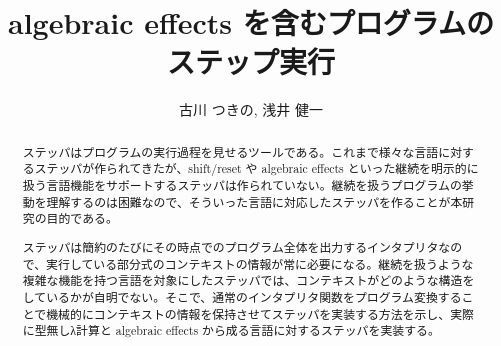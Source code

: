 \documentclass[japanese,draft]{jssst_ppl} %
\title{algebraic effects を含むプログラムのステップ実行}
\author{古川 つきの, 浅井 健一}
\begin{document}
\maketitle
\begin{abstract}
  ステッパはプログラムの実行過程を見せるツールである。これまで様々な言語に対するステッパが作られてきたが、shift/reset や algebraic effects といった継続を明示的に扱う言語機能をサポートするステッパは作られていない。継続を扱うプログラムの挙動を理解するのは困難なので、そういった言語に対応したステッパを作ることが本研究の目的である。
  
  ステッパは簡約のたびにその時点でのプログラム全体を出力するインタプリタなので、実行している部分式のコンテキストの情報が常に必要になる。継続を扱うような複雑な機能を持つ言語を対象にしたステッパでは、コンテキストがどのような構造をしているかが自明でない。そこで、通常のインタプリタ関数をプログラム変換することで機械的にコンテキストの情報を保持させてステッパを実装する方法を示し、実際に型無しλ計算と algebraic effects から成る言語に対するステッパを実装する。
\end{abstract}



















\end{document}
